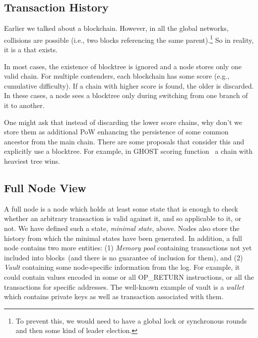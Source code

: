 \documentclass[]{report}   %
\begin{document}
\subsection{Transaction History}

Earlier we talked about a blockchain. However, in all the global networks, collisions are possible (i.e., two blocks referencing the same parent).\footnote{To prevent this, we would need to have a global lock or synchronous rounds and then some kind of leader election.} So in reality, it is a  that exists.


In most cases, the existence of blocktree is ignored and a node stores only one valid chain. For multiple contenders, each blockchain has some score (e.g., cumulative difficulty). If a chain with higher score is found, the older is discarded. In these cases, a node sees a blocktree only during switching from one branch of it to another. 

One might ask that instead of discarding the lower score chains, why don't we store them as additional PoW enhancing the persistence of some common ancestor from the main chain. There are some proposals that consider this and explicitly use a blocktree. For example, in GHOST scoring function~\cite{sompolinsky2015secure} a chain with heaviest tree wins. 



\subsection{Full Node View}
\label{fullnodeview}

A full node is a node which holds at least some state that is enough to check whether an arbitrary transaction is valid against it, and so applicable to it, or not. We have defined such a state,  \textit{minimal state}, above. Nodes also store the history from which the minimal states have been generated. In addition, a full node contains two more entities: (1) \textit{Memory pool} containing transactions not yet included into blocks~(and there is no guarantee of inclusion for them), and (2) \textit{Vault} containing some node-specific information from the log. For example, it could contain values encoded in some or all OP\_RETURN instructions, or all the transactions for specific addresses. The well-known example of vault is a \textit{wallet} which contains private keys as well as transaction associated with them.
\end{document}
